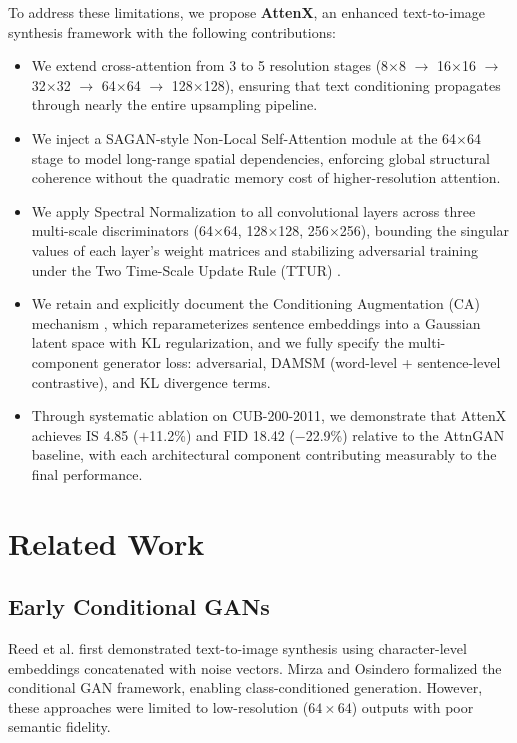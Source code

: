 \documentclass[conference]{IEEEtran}
\begin{document}
To address these limitations, we propose \textbf{AttenX}, an enhanced text-to-image synthesis framework with the following contributions:

\begin{itemize}
    \item We extend cross-attention from 3 to 5 resolution stages (8$\times$8 $\rightarrow$ 16$\times$16 $\rightarrow$ 32$\times$32 $\rightarrow$ 64$\times$64 $\rightarrow$ 128$\times$128), ensuring that text conditioning propagates through nearly the entire upsampling pipeline.
    \item We inject a SAGAN-style Non-Local Self-Attention module \cite{zhang2019self} at the 64$\times$64 stage to model long-range spatial dependencies, enforcing global structural coherence without the quadratic memory cost of higher-resolution attention.
    \item We apply Spectral Normalization \cite{miyato2018spectral} to all convolutional layers across three multi-scale discriminators (64$\times$64, 128$\times$128, 256$\times$256), bounding the singular values of each layer's weight matrices and stabilizing adversarial training under the Two Time-Scale Update Rule (TTUR) \cite{heusel2017gans}.
    \item We retain and explicitly document the Conditioning Augmentation (CA) mechanism \cite{xu2018attngan}, which reparameterizes sentence embeddings into a Gaussian latent space with KL regularization, and we fully specify the multi-component generator loss: adversarial, DAMSM (word-level + sentence-level contrastive), and KL divergence terms.
    \item Through systematic ablation on CUB-200-2011, we demonstrate that AttenX achieves IS 4.85 ($+$11.2\%) and FID 18.42 ($-$22.9\%) relative to the AttnGAN baseline, with each architectural component contributing measurably to the final performance.
\end{itemize}

\section{Related Work}
\label{sec:related}

\subsection{Early Conditional GANs}
Reed et al. \cite{reed2016generative} first demonstrated text-to-image synthesis using character-level embeddings concatenated with noise vectors. Mirza and Osindero \cite{mirza2014conditional} formalized the conditional GAN framework, enabling class-conditioned generation. However, these approaches were limited to low-resolution ($64\times64$) outputs with poor semantic fidelity.
\end{document}
